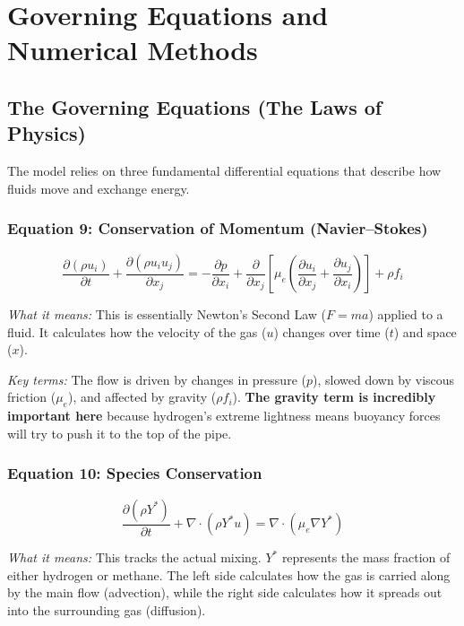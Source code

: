 \documentclass[12pt,a4paper]{report}
\begin{document}
\section{Governing Equations and Numerical Methods}

\subsection{The Governing Equations (The Laws of Physics)}

The model relies on three fundamental differential equations that describe how fluids move and exchange energy.

\subsubsection*{Equation 9: Conservation of Momentum (Navier--Stokes)}

\begin{equation}
  \frac{\partial(\rho u_i)}{\partial t}
  + \frac{\partial (\rho u_i u_j)}{\partial x_j}
  = -\frac{\partial p}{\partial x_i}
  + \frac{\partial}{\partial x_j} \left[
      \mu_e \left(
        \frac{\partial u_i}{\partial x_j}
        + \frac{\partial u_j}{\partial x_i}
      \right)
    \right]
  + \rho f_i
\end{equation}

\textit{What it means:} This is essentially Newton's Second Law ($F = ma$) applied to a fluid. It calculates how the velocity of the gas ($u$) changes over time ($t$) and space ($x$).

\textit{Key terms:} The flow is driven by changes in pressure ($p$), slowed down by viscous friction ($\mu_e$), and affected by gravity ($\rho f_i$). \textbf{The gravity term is incredibly important here} because hydrogen's extreme lightness means buoyancy forces will try to push it to the top of the pipe.

\subsubsection*{Equation 10: Species Conservation}

\begin{equation}
  \frac{\partial(\rho Y^*)}{\partial t}
  + \nabla \cdot (\rho Y^* u)
  = \nabla \cdot (\mu_e \nabla Y^*)
\end{equation}

\textit{What it means:} This tracks the actual mixing. $Y^*$ represents the mass fraction of either hydrogen or methane. The left side calculates how the gas is carried along by the main flow (advection), while the right side calculates how it spreads out into the surrounding gas (diffusion).
\end{document}
